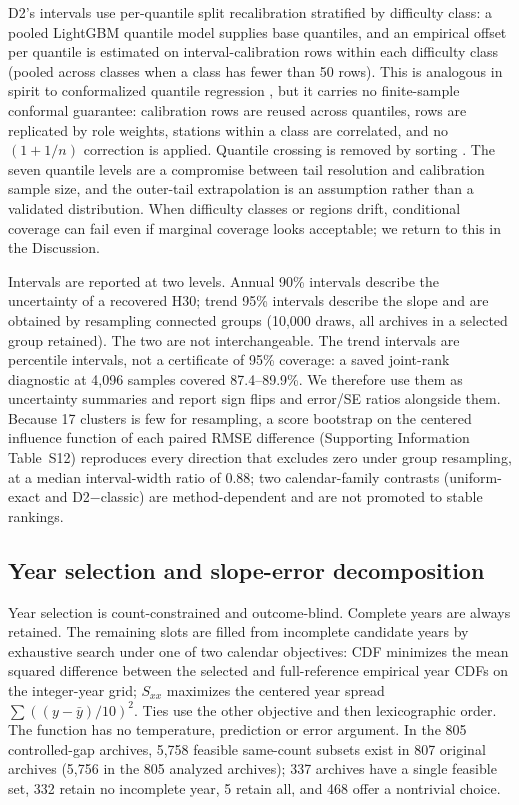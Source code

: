 D2's intervals use per-quantile split recalibration stratified by difficulty class: a pooled LightGBM quantile model supplies base quantiles, and an empirical offset per quantile is estimated on interval-calibration rows within each difficulty class (pooled across classes when a class has fewer than 50 rows). This is analogous in spirit to conformalized quantile regression \citep{romano2019}, but it carries no finite-sample conformal guarantee: calibration rows are reused across quantiles, rows are replicated by role weights, stations within a class are correlated, and no $(1+1/n)$ correction is applied. Quantile crossing is removed by sorting \citep{chernozhukov2010}. The seven quantile levels are a compromise between tail resolution and calibration sample size, and the outer-tail extrapolation is an assumption rather than a validated distribution. When difficulty classes or regions drift, conditional coverage can fail even if marginal coverage looks acceptable; we return to this in the Discussion.

Intervals are reported at two levels. Annual 90\% intervals describe the uncertainty of a recovered $\mathrm{H30}$; trend 95\% intervals describe the slope and are obtained by resampling connected groups (10,000 draws, all archives in a selected group retained). The two are not interchangeable. The trend intervals are percentile intervals, not a certificate of 95\% coverage: a saved joint-rank diagnostic at 4,096 samples covered 87.4--89.9\%. We therefore use them as uncertainty summaries and report sign flips and error/SE ratios alongside them. Because 17 clusters is few for resampling, a score bootstrap on the centered influence function of each paired RMSE difference (Supporting Information Table~S12) reproduces every direction that excludes zero under group resampling, at a median interval-width ratio of 0.88; two calendar-family contrasts (uniform-exact and D2$-$classic) are method-dependent and are not promoted to stable rankings.

\subsection{Year selection and slope-error decomposition}

Year selection is count-constrained and outcome-blind. Complete years are always retained. The remaining slots are filled from incomplete candidate years by exhaustive search under one of two calendar objectives: CDF minimizes the mean squared difference between the selected and full-reference empirical year CDFs on the integer-year grid; $S_{xx}$ maximizes the centered year spread $\sum((y-\bar y)/10)^2$. Ties use the other objective and then lexicographic order. The function has no temperature, prediction or error argument. In the 805 controlled-gap archives, 5,758 feasible same-count subsets exist in 807 original archives (5,756 in the 805 analyzed archives); 337 archives have a single feasible set, 332 retain no incomplete year, 5 retain all, and 468 offer a nontrivial choice.

